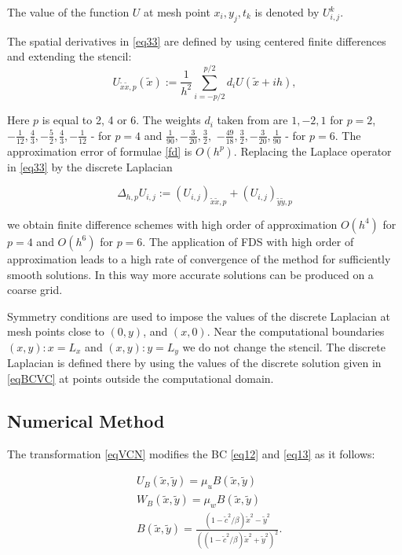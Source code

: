 \documentclass[12pt]{article}
\theoremstyle{theorem}
\theoremstyle{defi}
\begin{document}
The value of the function $U$ at mesh point $x_i,y_j,t_k$ is denoted by $U_{i,j}^k$.

\par
The spatial derivatives in \ref{eq33} are defined by using centered finite differences  
and extending the stencil:
\begin{equation}\label{fd}
U_{{\tilde x \tilde x},p}(\tilde x) :=  \frac{1}{h^2} \sum\limits_{i=-p/2}^{p/2} d_i U(\tilde x+ih),
\end{equation}

Here $p$ is equal to 2, 4 or 6.  The weights $d_i$ taken from  \cite{ref17} are  
 $ 1,-2,1$ for $p=2$, 
$-\frac{1}{12}, \frac{4}{3}, -\frac{5}{2}, \frac{4}{3}, -\frac{1}{12}$ - for $p=4$
 and 
$\frac{1}{90}, -\frac{3}{20}, \frac{3}{2},$ $ -\frac{49}{18}, \frac{3}{2}, -\frac{3}{20}, \frac{1}{90}$ - for $p=6$. The approximation error of  formulae \ref{fd} is $O(h^p)$. Replacing the Laplace operator in \ref{eq33} by the discrete Laplacian 

$$ \Delta_{h,p} U_{i,j} := (U_{i,j})_{{\tilde x \tilde x},p} + (U_{i,j})_{{\tilde y \tilde y},p}$$ 

we obtain finite difference schemes with high order of approximation $O(h^4)$ for $p=4$ and  $O(h^6)$ for $p=6 $.  The application of FDS with high order of approximation leads to a high rate of convergence of the method for   sufficiently smooth solutions. In this way more accurate solutions can be produced on a coarse grid.

Symmetry conditions are used to impose the values of the discrete Laplacian at mesh points close to ${(0,y)}$, and $(x,0)$. 
Near  the computational boundaries $(x,y):x=L_x$ and $(x,y):y=L_y$ we do not change the stencil. The discrete Laplacian
is defined  there by using the values of the discrete solution given in \ref{eqBCVC} at points outside the computational domain.



\subsection{Numerical Method}


The transformation \ref{eqVCN} modifies the BC \ref{eq12} and \ref{eq13} as it follows:

\begin{equation}\label{eqBCVC}
\begin{split}
&U_B(\tilde{x} , \tilde y) = \mu_u B( \tilde x, \tilde y) \\
&W_B(\tilde{x} , \tilde y) = \mu_w B( \tilde x, \tilde y) \\
&B(\tilde{x} , \tilde y) = \frac{ (1 - \tilde c^2/ \beta) \tilde x^2 - \tilde y^2}{( (1 - \tilde c^2/ \beta) \tilde x^2 + \tilde y^2)^2}. 
\end{split}
\end{equation}
\end{document}

